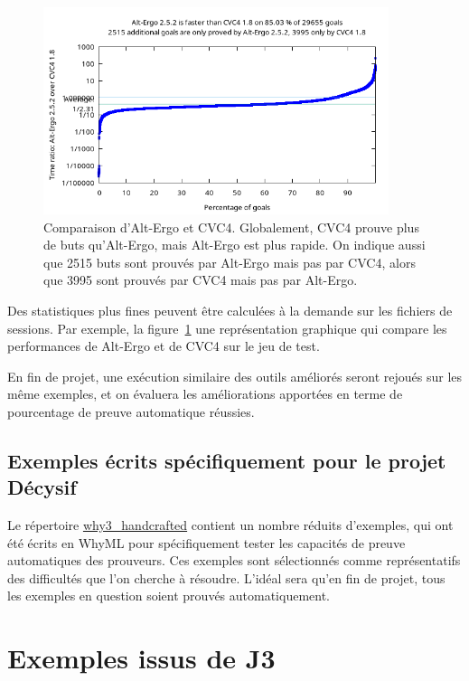 \documentclass[a4paper,11pt]{article}
\begin{document}
\begin{figure}
  \centering
  \includegraphics[width=0.9\textwidth]{AE-vs-CVC4.png}
  \caption{Comparaison d'Alt-Ergo et CVC4. Globalement, CVC4 prouve
    plus de buts qu'Alt-Ergo, mais Alt-Ergo est plus rapide. On
    indique aussi que 2515 buts sont prouvés par Alt-Ergo mais pas par
    CVC4, alors que 3995 sont prouvés par CVC4 mais pas par Alt-Ergo.}
  \label{fig:AEvsCVC4}
\end{figure}

Des statistiques plus fines peuvent être calculées à la demande sur
les fichiers de sessions. Par exemple, la figure~\ref{fig:AEvsCVC4}
une représentation graphique qui compare les performances de Alt-Ergo
et de CVC4 sur le jeu de test.

En fin de projet, une exécution similaire des outils améliorés seront
rejoués sur les même exemples, et on évaluera les améliorations
apportées en terme de pourcentage de preuve automatique réussies.

\subsection{Exemples écrits spécifiquement pour le projet Décysif}

Le répertoire \url{why3_handcrafted} contient un nombre réduits
d'exemples, qui ont été écrits en WhyML pour spécifiquement tester les
capacités de preuve automatiques des prouveurs. Ces exemples sont
sélectionnés comme représentatifs des difficultés que l'on cherche à
résoudre. L'idéal sera qu'en fin de projet, tous les exemples en
question soient prouvés automatiquement.

\section{Exemples issus de J3}
\end{document}
